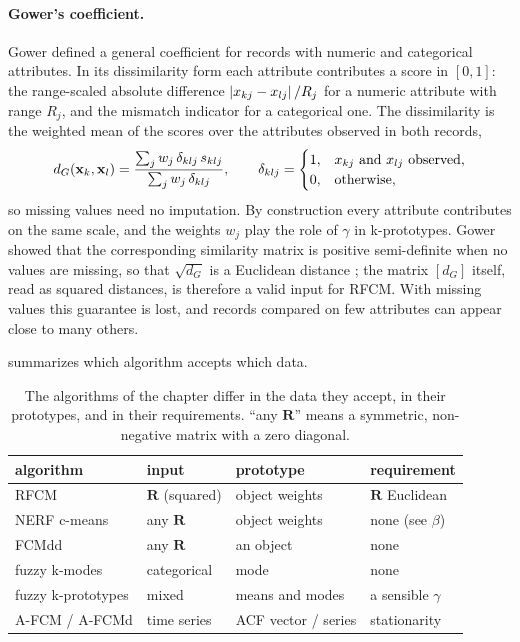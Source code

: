 \paragraph{Gower's coefficient.} Gower \cite{gower:1971:coefficient} defined a general coefficient for records with numeric and categorical attributes. In its dissimilarity form each attribute contributes a score in $[0,1]$: the range-scaled absolute difference $\left\lvert x_{kj}-x_{lj} \right\rvert/R_j$ for a numeric attribute with range $R_j$, and the mismatch indicator for a categorical one. The dissimilarity is the weighted mean of the scores over the attributes observed in both records,
\begin{equation}
  d_G(\mathbf{x}_k,\mathbf{x}_l)=\frac{\sum_{j}w_j\,\delta_{klj}\,s_{klj}}{\sum_{j}w_j\,\delta_{klj}},\qquad
  \delta_{klj}=\begin{cases}1,&x_{kj}\text{ and }x_{lj}\text{ observed},\\0,&\text{otherwise,}\end{cases}
  \label{eq:rel:gower}
\end{equation}
so missing values need no imputation. By construction every attribute contributes on the same scale, and the weights $w_j$ play the role of $\gamma$ in k-prototypes. Gower showed that the corresponding similarity matrix is positive semi-definite when no values are missing, so that $\sqrt{d_G}$ is a Euclidean distance \cite{gower:1971:coefficient,gower:1986:euclidean}; the matrix $[d_G]$ itself, read as squared distances, is therefore a valid input for RFCM. With missing values this guarantee is lost, and records compared on few attributes can appear close to many others.

 summarizes which algorithm accepts which data.

\begin{table}[htbp]\centering\small
\caption[Which algorithm for which data.]{The algorithms of the chapter differ in the data they accept, in their prototypes, and in their requirements. ``any $\mathbf{R}$'' means a symmetric, non-negative matrix with a zero diagonal.}
\label{tab:rel:choice}
\begin{tabular}{@{}llll@{}}
\toprule
algorithm & input & prototype & requirement\\ \midrule
RFCM & $\mathbf{R}$ (squared) & object weights & $\mathbf{R}$ Euclidean\\
NERF c-means & any $\mathbf{R}$ & object weights & none (see $\beta$)\\
FCMdd & any $\mathbf{R}$ & an object & none\\
fuzzy k-modes & categorical & mode & none\\
fuzzy k-prototypes & mixed & means and modes & a sensible $\gamma$\\
A-FCM / A-FCMd & time series & ACF vector / series & stationarity\\ \bottomrule
\end{tabular}
\end{table}

